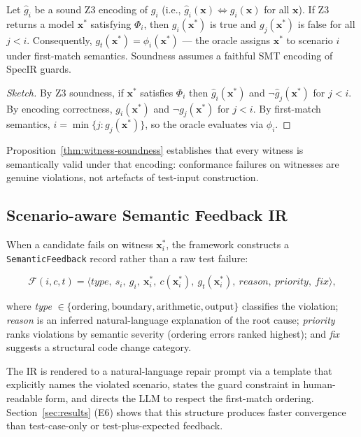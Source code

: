 \begin{proposition}
\label{thm:witness-soundness}
Let $\hat{g}_i$ be a sound Z3 encoding of $g_i$ (i.e., $\hat{g}_i(\mathbf{x}) \iff
g_i(\mathbf{x})$ for all $\mathbf{x}$).  If Z3 returns a model $\mathbf{x}^*$
satisfying $\Phi_i$, then $g_i(\mathbf{x}^*)$ is true and $g_j(\mathbf{x}^*)$ is false
for all $j < i$.  Consequently, $g_t(\mathbf{x}^*) = \phi_i(\mathbf{x}^*)$ — the
oracle assigns $\mathbf{x}^*$ to scenario $i$ under first-match semantics.
Soundness assumes a faithful SMT encoding of SpecIR guards.
\end{proposition}
\begin{proof}[Sketch]
By Z3 soundness, if $\mathbf{x}^*$ satisfies $\Phi_i$ then $\hat{g}_i(\mathbf{x}^*)$
and $\lnot\hat{g}_j(\mathbf{x}^*)$ for $j < i$.  By encoding correctness,
$g_i(\mathbf{x}^*)$ and $\lnot g_j(\mathbf{x}^*)$ for $j < i$.  By first-match
semantics, $i = \min\{j : g_j(\mathbf{x}^*)\}$, so the oracle evaluates via $\phi_i$.
\end{proof}

Proposition~\ref{thm:witness-soundness} establishes that every witness is semantically
valid under that encoding: conformance failures on witnesses are genuine violations, not
artefacts of test-input construction.

\subsection{Scenario-aware Semantic Feedback IR}
\label{subsec:feedback-ir}

When a candidate fails on witness $\mathbf{x}_i^*$, the framework constructs a
\texttt{SemanticFeedback} record rather than a raw test failure:

\begin{equation}
  \mathcal{F}(i, c, t) = \langle \textit{type},\ s_i,\ g_i,\ \mathbf{x}_i^*,
  \ c(\mathbf{x}_i^*),\ g_t(\mathbf{x}_i^*),\ \textit{reason},\
  \textit{priority},\ \textit{fix} \rangle,
\end{equation}

where \textit{type} $\in \{\text{ordering}, \text{boundary}, \text{arithmetic},
\text{output}\}$ classifies the violation;
\textit{reason} is an inferred natural-language explanation of the root cause;
\textit{priority} ranks violations by semantic severity (ordering errors ranked highest);
and \textit{fix} suggests a structural code change category.

The IR is rendered to a natural-language repair prompt via a template that explicitly
names the violated scenario, states the guard constraint in human-readable form, and
directs the LLM to respect the first-match ordering.  Section~\ref{sec:results} (E6)
shows that this structure produces faster convergence than test-case-only or
test-plus-expected feedback.

